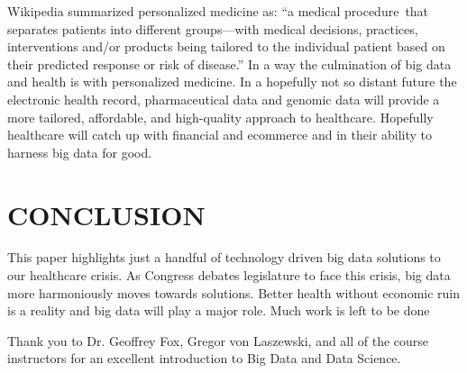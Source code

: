 \documentclass[sigconf]{acmart}
\begin{document}
Wikipedia summarized personalized medicine as: ``a medical
procedure that separates patients into different groups—with medical
decisions, practices, interventions and/or products being tailored to
the individual patient based on their predicted response or risk of
disease.''  \cite{wiki-personalized} In a way the culmination of big
data and health is with personalized medicine.  In a hopefully not so
distant future the electronic health record, pharmaceutical data and
genomic data will provide a more tailored, affordable, and
high-quality approach to healthcare.  Hopefully healthcare will catch
up with financial and ecommerce and in their ability to harness big
data for good.


\section{	CONCLUSION}

This paper highlights just a handful of technology driven big data
solutions to our healthcare crisis.  As Congress debates legislature
to face this crisis, big data more harmoniously moves towards
solutions.  Better health without economic ruin is a reality and big
data will play a major role.  Much work is left to be done

\begin{acks}

Thank you to Dr. Geoffrey Fox, Gregor von Laszewski, and all of the
course instructors for an excellent introduction to Big Data and Data
Science.

\end{acks}



 
\end{document}
